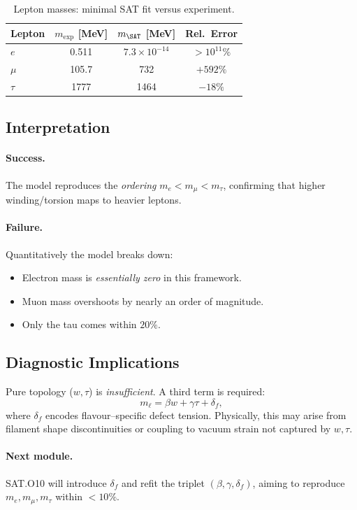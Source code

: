 \begin{table}[ht]
\centering
\caption{Lepton masses: minimal SAT fit versus experiment.}
\label{tab:lepton_minimal}
\begin{tabular}{lccc}
\toprule
Lepton & $m_{\exp}$ [MeV] & $m_{\SAT}$ [MeV] & Rel.\ Error \\
\midrule
$e$   & 0.511 & $7.3\times 10^{-14}$ & $>10^{11}\%$ \\
$\mu$ & 105.7 & 732                & $+592\%$ \\
$\tau$ & 1777 & 1464               & $-18\%$ \\
\bottomrule
\end{tabular}
\end{table}

\subsection{Interpretation}

\paragraph{Success.}
The model reproduces the \emph{ordering}
$m_e < m_\mu < m_\tau$,
confirming that higher winding/torsion maps to heavier leptons.

\paragraph{Failure.}
Quantitatively the model breaks down:
\begin{itemize}
  \item Electron mass is \emph{essentially zero} in this framework.
  \item Muon mass overshoots by nearly an order of magnitude.
  \item Only the tau comes within $20\%$.
\end{itemize}

\subsection{Diagnostic Implications}

Pure topology ($w,\tau$) is \emph{insufficient}.  A third term is required:
\[
m_\ell = \beta w + \gamma \tau + \delta_f,
\]
where $\delta_f$ encodes flavour–specific defect tension.
Physically, this may arise from filament shape discontinuities or coupling
to vacuum strain not captured by $w,\tau$.

\paragraph{Next module.}
SAT.O10 will introduce $\delta_f$ and refit the triplet
$(\beta,\gamma,\delta_f)$, aiming to reproduce
$m_e,m_\mu,m_\tau$ within $<10\%$.

